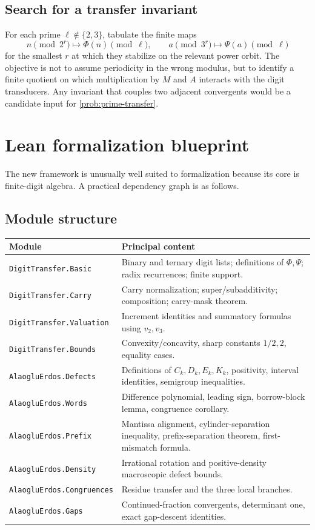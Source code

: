 \documentclass[11pt]{article}
\theoremstyle{definition}
\begin{document}
\subsection{Search for a transfer invariant}

For each prime \(\ell\notin\{2,3\}\), tabulate the finite maps
\[
 n\pmod{2^r}\mapsto\Phi(n)\pmod\ell,
 \qquad
 a\pmod{3^r}\mapsto\Psi(a)\pmod\ell
\]
for the smallest \(r\) at which they stabilize on the relevant power orbit.
The objective is not to assume periodicity in the wrong modulus, but to
identify a finite quotient on which multiplication by \(M\) and \(A\)
interacts with the digit transducers.  Any invariant that couples two
adjacent convergents would be a candidate input for
\cref{prob:prime-transfer}.

\section{Lean formalization blueprint}
\label{sec:lean}

The new framework is unusually well suited to formalization because its
core is finite-digit algebra.  A practical dependency graph is as follows.

\subsection{Module structure}

\begin{longtable}{p{}p{}}
\toprule
Module & Principal content\\
\midrule
\endhead
\texttt{DigitTransfer.Basic} & Binary and ternary digit lists; definitions
of \(\Phi,\Psi\); radix recurrences; finite support.\\
\texttt{DigitTransfer.Carry} & Carry normalization; super/subadditivity;
composition; carry-mask theorem.\\
\texttt{DigitTransfer.Valuation} & Increment identities and summatory
formulas using \(v_2,v_3\).\\
\texttt{DigitTransfer.Bounds} & Convexity/concavity, sharp constants
\(1/2,2\), equality cases.\\
\texttt{AlaogluErdos.Defects} & Definitions of \(C_k,D_k,E_k,K_k\),
positivity, interval identities, semigroup inequalities.\\
\texttt{AlaogluErdos.Words} & Difference polynomial, leading sign,
borrow-block lemma, congruence corollary.\\
\texttt{AlaogluErdos.Prefix} & Mantissa alignment, cylinder-separation
inequality, prefix-separation theorem, first-mismatch formula.\\
\texttt{AlaogluErdos.Density} & Irrational rotation and positive-density
macroscopic defect bounds.\\
\texttt{AlaogluErdos.Congruences} & Residue transfer and the three local
branches.\\
\texttt{AlaogluErdos.Gaps} & Continued-fraction convergents, determinant
one, exact gap-descent identities.\\
\bottomrule
\end{longtable}
\end{document}
